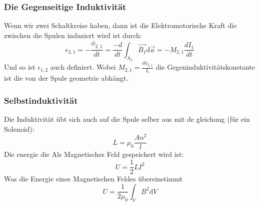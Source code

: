 \documentclass{article}
\begin{document}
\subsubsection*{Die Gegenseitige Induktivität}
Wenn wir zwei Schaltkreise haben, dann ist die Elektromotorische Kraft die zwischen die Spulen induziert wird ist durch:
\[\epsilon_{2,1}=-\frac{\phi_{2,1}}{dt}=\frac{-d }{dt} \int^{}_{A_2}\vec{B_1}\text{d}\vec{a}=-M_{2,1}\frac{dI_1}{dt}\]
Und so ist $\epsilon_{1,2}$ auch definiert. Wobei $M_{2,1}=\frac{d\phi_{2,1}}{I_1}$ die Gegeninduktivitätskonstante ist die von der Spule geometrie abhängt.
\subsubsection*{Selbstinduktivität}
Die Induktivität übt sich auch auf die Spule selber aus mit de gleichung (für ein Solenoid):
\[L=\mu_0 \frac{An^2}{l}\]
Die energie die Als Magnetisches Feld gespeichert wird ist:
\[U=\frac{1}{2}LI^2\]
Was die Energie eines Magnetischen Feldes übereinstimmt
\[U=\frac{1}{2\mu_0}\int^{}_{V}B^2\text{d}V\]
\end{document}
